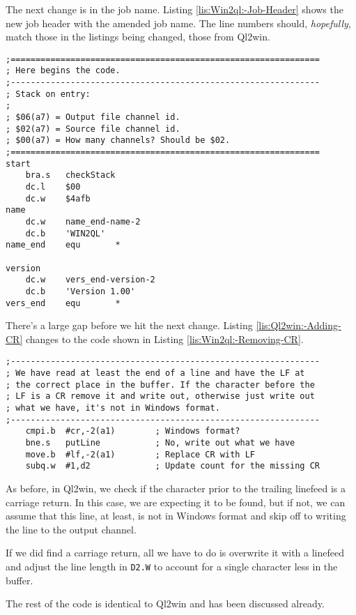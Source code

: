 The next change is in the job name. Listing \ref{lis:Win2ql:-Job-Header}
shows the new job header with the amended job name. The line numbers
should, \emph{hopefully}, match those in the listings being changed,
those from Ql2win.

\begin{lstlisting}[caption={Win2ql: Job Header},label={lis:Win2ql:-Job-Header},firstnumber=35]
;==============================================================
; Here begins the code.
;--------------------------------------------------------------
; Stack on entry:
;
; $06(a7) = Output file channel id.
; $02(a7) = Source file channel id.
; $00(a7) = How many channels? Should be $02.
;==============================================================
start
    bra.s   checkStack
    dc.l    $00
    dc.w    $4afb
name
    dc.w    name_end-name-2
    dc.b    'WIN2QL'
name_end    equ       *

version
    dc.w    vers_end-version-2
    dc.b    'Version 1.00'
vers_end    equ       *
\end{lstlisting}

There's a large gap before we hit the next change. Listing \ref{lis:Ql2win:-Adding-CR}
changes to the code shown in Listing \ref{lis:Win2ql:-Removing-CR}.

\begin{lstlisting}[caption={Win2ql: Removing a CR},label={lis:Win2ql:-Removing-CR},firstnumber=120]
;--------------------------------------------------------------
; We have read at least the end of a line and have the LF at 
; the correct place in the buffer. If the character before the
; LF is a CR remove it and write out, otherwise just write out
; what we have, it's not in Windows format.
;--------------------------------------------------------------
    cmpi.b  #cr,-2(a1)        ; Windows format?
    bne.s   putLine           ; No, write out what we have
    move.b  #lf,-2(a1)        ; Replace CR with LF
    subq.w  #1,d2             ; Update count for the missing CR

\end{lstlisting}

As before, in Ql2win, we check if the character prior to the trailing
linefeed is a carriage return. In this case, we are expecting it to
be found, but if not, we can assume that this line, at least, is not
in Windows format and skip off to writing the line to the output channel.

If we did find a carriage return, all we have to do is overwrite it
with a linefeed and adjust the line length in \lstinline[basicstyle={\ttfamily},showstringspaces=false]!D2.W!
to account for a single character less in the buffer.

The rest of the code is identical to Ql2win and has been discussed
already.
